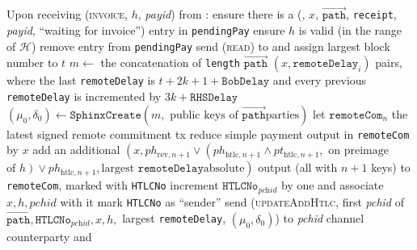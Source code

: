 \begin{algorithmic}[1]
    \State Upon receiving (\textsc{invoice}, $h$, \textit{payid}) from \bob:
    \Indent
      \State ensure there is a (\bob, $x$, $\overrightarrow{\mathtt{path}}$,
      \texttt{receipt}, \textit{payid}, ``waiting for invoice'') entry in
      \texttt{pendingPay}
      \State ensure $h$ is valid (in the range of $\mathcal{H}$)
      \State remove entry from \texttt{pendingPay}
      \State send (\textsc{read}) to \ledger{} and assign largest block number
      to $t$
      \State $m \gets$ the concatenation of \texttt{length}
      $\overrightarrow{\mathtt{path}}$ $\left(x, \mathtt{remoteDelay}_i\right)$
      pairs, where the last \texttt{remoteDelay} is $t + 2k + 1 +
      \mathtt{BobDelay}$ and every previous \texttt{remoteDelay} is incremented
      by $3k + \mathtt{RHSDelay}$ 
      \State $\left(\mu_0, \delta_0\right) \gets \mathtt{SphinxCreate}\left(m,
      \text{ public keys of } \overrightarrow{\mathtt{path}} \text{
      parties}\right)$
      \State let $\mathtt{remoteCom}_n$ the latest signed remote commitment tx
      \State reduce simple payment output in \texttt{remoteCom} by $x$
      \State add an additional $\left(x, ph_{\mathrm{rev}, n+1} \vee
      \left(ph_{\mathrm{htlc}, n+1} \wedge pt_{\mathrm{htlc}, n+1}, \text{ on
      preimage}\right.\right.$ $\left.\left.\text{of } h\right) \vee
      ph_{\mathrm{htlc}, n+1}, \text{largest } \mathtt{remoteDelay} \text{
      absolute}\right)$ output (all with $n+1$ keys) to \texttt{remoteCom},
      marked with \texttt{HTLCNo}
      \State increment $\mathtt{HTLCNo}_{\textit{pchid}}$ by one and associate
      $x, h, \mathit{pchid}$ with it
      \State mark \texttt{HTLCNo} as ``sender''
      \State send (\textsc{updateAddHtlc}, first \textit{pchid} of
      $\overrightarrow{\mathtt{path}}, \mathtt{HTLCNo}_{\textit{pchid}}, x, h,$
      largest \texttt{remoteDelay}, $\left(\mu_0, \delta_0\right)$) to
      \textit{pchid} channel counterparty and \adversary
    \EndIndent
    \State


\end{algorithmic}
